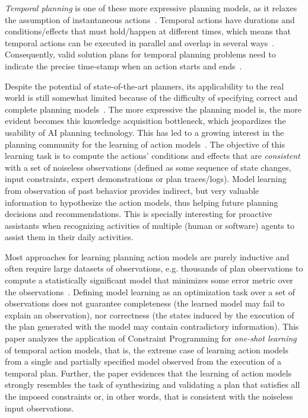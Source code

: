 \documentclass[runningheads]{llncs}
\begin{document}
{\em Temporal planning} is one of these more expressive planning models, as it relaxes the assumption of instantaneous actions~\cite{fox2003pddl2}. Temporal actions have durations and conditions/effects that must hold/happen at different times, which means that temporal actions can be executed in parallel and overlap in several ways~\cite{cushing2007temporal}. Consequently, valid solution plans for temporal planning problems need to indicate the precise time-stamp when an action starts and ends~\cite{howey2004val}.

Despite the potential of state-of-the-art planners, its applicability to the real world is still somewhat limited because of the difficulty of specifying correct and complete planning models~\cite{kambhampati2007model}. The more expressive the planning model is, the more evident becomes this knowledge acquisition bottleneck, which jeopardizes the usability of AI planning technology. This has led to a growing interest in the planning community for the learning of action models~\cite{jimenez2012review}. The objective of this learning task is to compute the actions' conditions and effects that are {\em consistent} with a set of noiseless observations (defined as some sequence of state changes, input constraints,
expert demonstrations or plan traces/logs). Model learning from observation of past behavior provides indirect, but very valuable information to hypothesize the action models, thus helping future planning decisions and recommendations. This is specially interesting for proactive assistants when recognizing activities of multiple (human or software) agents to assist them in their daily activities.

Most approaches for learning planning action models are purely inductive and often require large datasets of observations, e.g. thousands of plan observations to compute a statistically significant model that minimizes some error metric over the observations~\cite{kuvcera2018louga,MouraoZPS12,yang2007learning,zhuo2013action}. Defining model learning as an optimization task over a set of observations does not guarantee completeness (the learned model may fail to explain an observation), nor correctness (the states induced by the execution of the plan generated with the model may contain contradictory information). This paper analyzes the application of Constraint Programming for {\em one-shot learning} of temporal action models, that is, the extreme case of learning action models from a single and partially specified model observed from the execution of a temporal plan. Further, the paper evidences that the learning of action models strongly resembles the task of synthesizing and validating a plan that satisfies all the imposed constraints or, in other words, that is consistent with the noiseless input observations.
\end{document}
